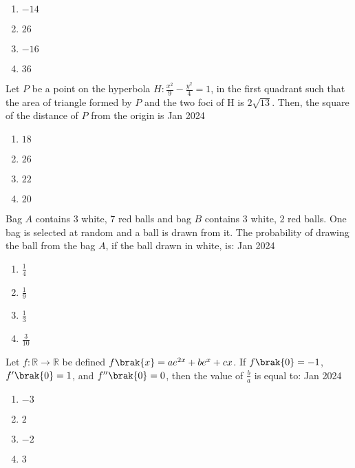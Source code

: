         \begin{multicols}{4}
        \begin{enumerate}
        \item $-14$
        \item $26$
        \item $-16$
        \item $36$
        \end{enumerate}
        \end{multicols}


    \item Let $P$ be a point on the hyperbola $H:\frac{x^{2}}{9}-\frac{y^{2}}{4}=1$, in the first quadrant such that the area of triangle formed by $P$ and the two foci of H is $2\sqrt{13}$. Then, the square of the distance of $P$ from the origin is \hfill{Jan 2024}

        \begin{multicols}{4}
        \begin{enumerate}
        \item $18$
        \item $26$
        \item $22$
        \item $20$
        \end{enumerate}
        \end{multicols}

    \item Bag $A$ contains $3$ white, $7$ red balls and bag $B$ contains $3$ white, $2$ red balls. One bag is selected at random and a ball is drawn from it. The probability of drawing the ball from the bag $A$, if the ball drawn in white, is: \hfill{Jan 2024}

        \begin{multicols}{4}
        \begin{enumerate}
        \item $\frac{1}{4}$
        \item $\frac{1}{9}$
        \item $\frac{1}{3}$
        \item $\frac{3}{10}$
        \end{enumerate}
        \end{multicols}

    \item Let $f:\mathbb{R}\rightarrow\mathbb{R}$ be defined $f\brak{x}=ae^{2x}+be^{x}+cx$. If $f\brak{0}=-1$, $f^{\prime}\brak{0}=1$, and $f^{\prime\prime}\brak{0}=0$, then the value of $\frac{b}{a}$ is equal to: \hfill{Jan 2024}

        \begin{multicols}{4}
        \begin{enumerate}
        \item $-3$
        \item $2$
        \item $-2$
        \item $3$
        \end{enumerate}
        \end{multicols}


